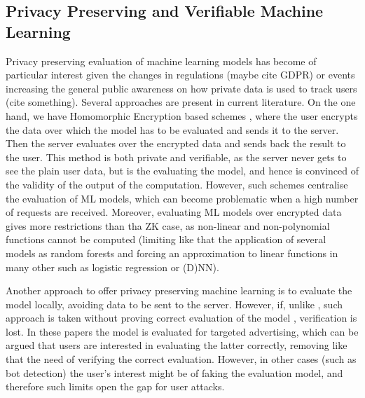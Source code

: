 \subsection{Privacy Preserving and Verifiable Machine Learning}

Privacy preserving evaluation of machine learning models has become of particular interest given the changes in regulations (maybe cite GDPR) or events increasing the general public awareness on how private data is used to track users (cite something). 
Several approaches are present in current literature. On the one hand, we have Homomorphic Encryption based schemes \cite{Dowlin:2016:CAN:3045390.3045413,mlconfidential,bos2013private}, where the user encrypts the data over which the model has to be evaluated and sends it to the server. Then the server evaluates over the encrypted data and sends back the result to the user. This method is both private and verifiable, as the server never gets to see the plain user data, but is the evaluating the model, and hence is convinced of the validity of the output of the computation. 
However, such schemes centralise the evaluation of ML models, which can become problematic when a high number of requests are received. 
Moreover, evaluating ML models over encrypted data gives more restrictions than tha ZK case, as non-linear and non-polynomial functions cannot be computed (limiting like that the application of several models as random forests and forcing an approximation to linear functions in many other such as logistic regression or (D)NN). 

Another approach to offer privacy preserving machine learning is to evaluate the model locally, avoiding data to be sent to the server. However, if, unlike \name, such approach is taken without proving correct evaluation of the model \cite{DBLP:journals/corr/abs-1710-03275,Bilenko:2011:PCP:2020408.2020475,Guha:2011:PPP:1972457.1972475}, verification is lost. In these papers the model is evaluated for targeted advertising, which can be argued that users are interested in evaluating the latter correctly, removing like that the need of verifying the correct evaluation. However, in other cases (such as bot detection) the user's interest might be of faking the evaluation model, and therefore such limits open the gap for user attacks. 

